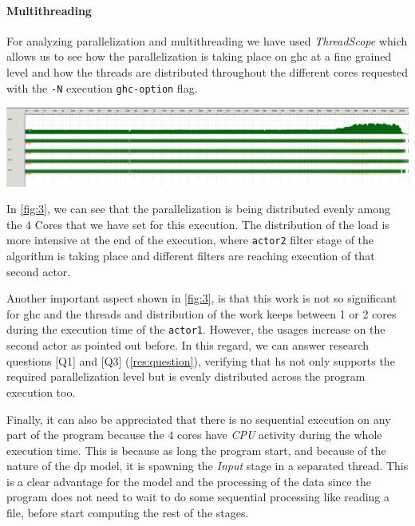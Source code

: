 \documentclass[preprint]{elsarticle}
\begin{document}
\paragraph{Multithreading} For analyzing parallelization and multithreading we have used \textit{ThreadScope} \cite{threadscope} which allows us to see how the parallelization is taking place on \acrshort{ghc} at a fine grained level and how the threads are distributed throughout the different cores requested with the \texttt{-N} execution \texttt{ghc-option} flag.

\begin{minipage}[t!]{\linewidth}

  \includegraphics[width=\textwidth]{screen_1}
  \captionsetup{type=figure}
  \label{fig:3}
\end{minipage}

In \autoref{fig:3}, we can see that the parallelization is being distributed evenly among the $4$ Cores that we have set for this execution.
The distribution of the load is more intensive at the end of the execution, where \texttt{actor2} filter stage 
of the algorithm is taking place and different filters are reaching execution of that second actor.

Another important aspect shown in \autoref{fig:3}, is that this work is not so significant for \acrshort{ghc} and the threads and distribution of the work keeps between 1 or 2 cores during the execution time of the \texttt{actor1}. However, the usages increase on the second actor as pointed out before. In this regard, we can answer research questions [Q1] and [Q3] (\autoref{res:question}), verifying that \acrshort{hs} not only supports the required parallelization level but is evenly distributed across the program execution too.

Finally, it can also be appreciated that there is no sequential execution on any part of the program because the $4$ cores have \textit{CPU} activity during the whole execution time. This is because as long the program start, and because of the nature of the \acrshort{dp} model, it is spawning the \textit{Input} stage in a separated thread. This is a clear advantage for the model and the processing of the data since the program does not need to wait to do some sequential processing like reading a file, before start computing the rest of the stages.
\end{document}
